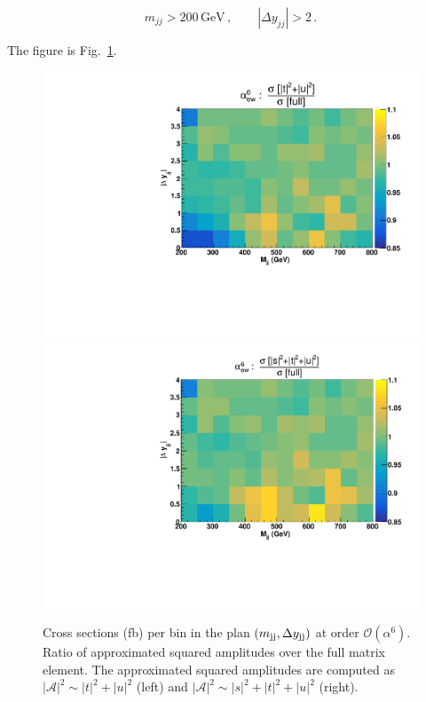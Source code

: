 \begin{equation}
\label{eq:inclusive}
	m_{jj} > 200 \,\textrm{GeV}\,,\qquad |\Delta y_{jj}| > 2\,.
\end{equation}


The figure is Fig.~\ref{fig:ratio2d_LO}.



\begin{figure}[hbt]
\centering
\includegraphics[scale=0.395]{figures/scanfigures/ratio_tu.pdf}
\includegraphics[scale=0.395]{figures/scanfigures/ratio_stu.pdf}
\caption{Cross sections (fb) per bin in the plan $\left(m_{\text{j}\text{j}}, \Delta y_{\text{j}\text{j}}\right)$ at order $\mathcal{O}(\alpha^6)$. 
Ratio of approximated squared amplitudes over the full matrix element. The approximated squared amplitudes are computed as $|\mathcal{A}|^2 \sim |t|^2 + |u|^2$ (left) and $|\mathcal{A}|^2 \sim |s|^2 + |t|^2 + |u|^2$ (right).}
\label{fig:ratio2d_LO}
\end{figure}

